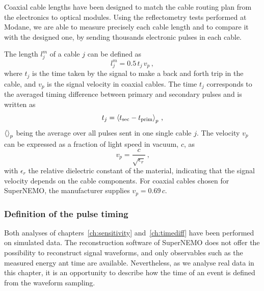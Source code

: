 Coaxial cable lengths have been designed to match the cable routing plan from the electronics to optical modules.
Using the reflectometry tests performed at Modane, we are able to measure precisely each cable length and to compare it with the designed one, by sending thousands electronic pulses in each cable.

The length $l_{j}^{m}$ of a cable $j$ can be defined as
\begin{equation}
  l_{j}^{m}= 0.5\,t_{j}\,v_{p}\, ,
\end{equation}
where $t_{j}$ is the time taken by the signal to make a back and forth trip in the cable, and $v_{p}$ is the signal velocity in coaxial cables.
The time $t_{j}$ corresponds to the averaged timing difference between primary and secondary pulses and is written as
\begin{equation}
  t_{j} = \braket{t_{\text{sec}}-t_{\text{prim}}}_{p} \, \text{,}
  \label{eq:t_j}
\end{equation}
$\braket{}_{p}$ being the average over all pulses sent in one single cable $j$.
The velocity $v_{p}$ can be expressed as a fraction of light speed in vacuum, $c$, as
\begin{equation*}
  v_{p}=\frac{c}{\sqrt{\epsilon_{r}}}\,\text{,}
\end{equation*}
with $\epsilon_{r}$ the relative dielectric constant of the material, indicating that the signal velocity depends on the cable components.
For coaxial cables chosen for SuperNEMO, the manufacturer supplies ${v_{p}=0.69\,c}$.

\subsubsection*{Definition of the pulse timing}

Both analyses of chapters~\ref{ch:sensitivity} and~\ref{ch:timediff} have been performed on simulated data.
The reconstruction software of SuperNEMO does not offer the possibility to reconstruct signal waveforms, and only observables such as the measured energy ant time are available.
Nevertheless, as we analyse real data in this chapter, it is an opportunity to describe how the time of an event is defined from the waveform sampling.

